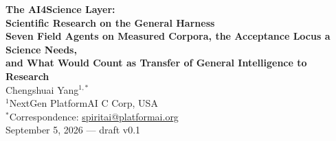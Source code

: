 \documentclass[11pt]{article}
\theoremstyle{definition}
\begin{document}
\begin{center}
{\LARGE\bfseries The AI4Science Layer:}\\[4pt]
{\LARGE\bfseries Scientific Research on the General Harness}\\[8pt]
{\large\bfseries Seven Field Agents on Measured Corpora, the Acceptance Locus a Science Needs,\\[2pt]
and What Would Count as Transfer of General Intelligence to Research}\\[16pt]
{\large Chengshuai Yang$^{1,*}$}\\[5pt]
{\normalsize $^{1}$NextGen PlatformAI C Corp, USA}\\[4pt]
{\normalsize $^{*}$Correspondence: \href{mailto:spiritai@platformai.org}{spiritai@platformai.org}}\\[10pt]
{\small September 5, 2026 --- draft v0.1}
\end{center}
\end{document}
